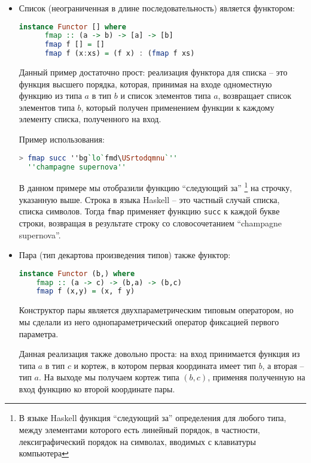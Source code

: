 \begin{itemize}
  \item Список (неограниченная в длине последовательность) является функтором:

  \begin{lstlisting}[language=Haskell]
    instance Functor [] where
      fmap :: (a -> b) -> [a] -> [b]
      fmap f [] = []
      fmap f (x:xs) = (f x) : (fmap f xs)
  \end{lstlisting}

  Данный пример достаточно прост: реализация функтора для списка -- это функция высшего порядка, которая,
  принимая на входе одноместную функцию из типа $a$ в тип $b$ и список элементов типа $a$, возвращает список элементов типа $b$, который
  получен применением функции к каждому элементу списка, полученного на вход.

  Пример использования:

\begin{lstlisting}[language=Haskell]
  > fmap succ ''bg`lo`fmd\USrtodqmnu`''
  ''champagne supernova''
\end{lstlisting}

В данном примере мы отобразили функцию ``следующий за''
\footnote{В языке Haskell функция ``следующий за'' определения для
любого типа, между элементами которого есть линейный порядок,
в частности, лексиграфический порядок на символах, вводимых с клавиатуры компьютера}
на строчку, указанную выше. Строка в языка Haskell -- это частный случай списка, списка символов.
Тогда \verb"fmap" применяет функцию \verb"succ" к каждой букве строки, возвращая в результате
строку со словосочетанием ``champagne supernova''.

  \item Пара (тип декартова произведения типов) также функтор:
  \begin{lstlisting}[language=Haskell]
  instance Functor (b,) where
    fmap :: (a -> c) -> (b,a) -> (b,c)
    fmap f (x,y) = (x, f y)
  \end{lstlisting}

  Конструктор пары является двухпараметрическим типовым оператором, но мы сделали из него однопараметрический оператор фиксацией первого параметра.

  Данная реализация также довольно проста: на вход принимается функция из типа $a$ в тип $c$ и кортеж, в котором первая координата имеет тип $b$, а вторая -- тип $a$.
  На выходе мы получаем кортеж типа $(b,c)$, применяя полученную на вход функцию ко второй координате пары.


\end{itemize}
